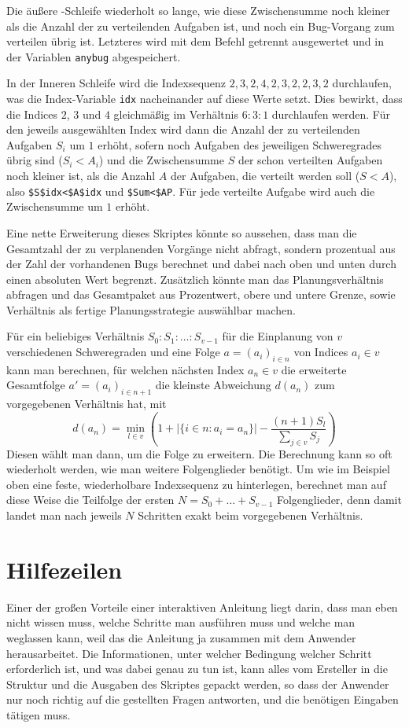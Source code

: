 Die äußere -Schleife wiederholt so lange, wie diese Zwischensumme noch kleiner als die Anzahl der zu verteilenden Aufgaben ist, und noch ein Bug-Vorgang zum verteilen übrig ist. Letzteres wird mit dem Befehl  getrennt ausgewertet und in der Variablen \verb|anybug| abgespeichert.

In der Inneren Schleife wird die Indexsequenz $2,3,2,4,2,3,2,2,3,2$ durchlaufen, was die Index-Variable \verb|idx| nacheinander auf diese Werte setzt. Dies bewirkt, dass die Indices $2$, $3$ und $4$ gleichmäßig im Verhältnis $6:3:1$ durchlaufen werden. Für den jeweils ausgewählten Index wird dann die Anzahl der zu verteilenden Aufgaben $S_i$ um $1$ erhöht, sofern noch Aufgaben des jeweiligen Schweregrades übrig sind ($S_i<A_i$) und die Zwischensumme $S$ der schon verteilten Aufgaben noch kleiner ist, als die Anzahl $A$ der Aufgaben, die verteilt werden soll ($S<A$), also \verb|$S$idx<$A$idx| und \verb|$Sum<$AP|. Für jede verteilte Aufgabe wird auch die Zwischensumme um $1$ erhöht.

Eine nette Erweiterung dieses Skriptes könnte so aussehen, dass man die Gesamtzahl der zu verplanenden Vorgänge nicht abfragt, sondern prozentual aus der Zahl der vorhandenen Bugs berechnet und dabei nach oben und unten durch einen absoluten Wert begrenzt. Zusätzlich könnte man das Planungsverhältnis abfragen und das Gesamtpaket aus Prozentwert, obere und untere Grenze, sowie Verhältnis als fertige Planungsstrategie auswählbar machen. 

Für ein beliebiges Verhältnis $S_0:S_1:\dots :S_{v-1}$ für die Einplanung von $v$ verschiedenen Schweregraden und eine Folge $a=(a_i)_{i\in n}$ von Indices $a_i\in v$ kann man berechnen, für welchen nächsten Index $a_n\in v$ die erweiterte Gesamtfolge $a'=(a_i)_{i\in n+1}$ die kleinste Abweichung $d(a_n)$ zum vorgegebenen Verhältnis hat, mit
\[d(a_n)=\min_{l\in v}\left(1+ \big|\{i\in n\colon a_i=a_n\}\big|-\frac{(n+1)S_l}{\sum_{j\in v}S_j}\right)\]
Diesen wählt man dann, um die Folge zu erweitern. Die Berechnung kann so oft wiederholt werden, wie man weitere Folgenglieder benötigt. Um wie im Beispiel oben eine feste, wiederholbare Indexsequenz zu hinterlegen, berechnet man  auf diese Weise die Teilfolge der ersten $N=S_0+\dots+S_{v-1}$ Folgenglieder, denn damit landet man nach jeweils $N$ Schritten exakt beim vorgegebenen Verhältnis.

\section{Hilfezeilen}\label{Hilfezeilen}
Einer der großen Vorteile einer interaktiven Anleitung liegt darin, dass man eben nicht wissen muss, welche Schritte man ausführen muss und welche man weglassen kann, weil das die Anleitung ja zusammen mit dem Anwender herausarbeitet. Die Informationen, unter welcher Bedingung welcher Schritt erforderlich ist, und was dabei genau zu tun ist, kann alles vom Ersteller in die Struktur und die Ausgaben des Skriptes gepackt werden, so dass der Anwender nur noch richtig auf die gestellten Fragen antworten, und die benötigen Eingaben tätigen muss.

